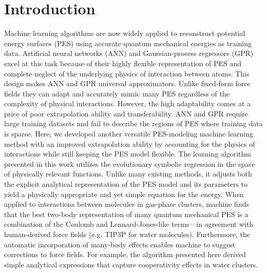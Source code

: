\documentclass[aps,prl,reprint,amsmath,amssymb,nature]{revtex4-1}
\begin{document}
\maketitle



\section{Introduction}

Machine learning algorithms are now widely applied to reconstruct potential energy surfaces (PES) using accurate quantum mechanical energies as training data. Artificial neural networks (ANN) and Gaussian-process regressors (GPR) excel at this task because of their highly flexible representation of PES and complete neglect of the underlying physics of interaction between atoms. This design makes ANN and GPR universal approximators. Unlike fixed-form force fields they can adapt and accurately mimic many PES regardless of the complexity of physical interactions. However, the high adaptability comes at a price of poor extrapolation ability and transferability. ANN and GPR require large training datasets and fail to describe the regions of PES where training data is sparse. Here, we developed another versatile PES-modeling machine learning method with an improved extrapolation ability by accounting for the physics of interactions while still keeping the PES model flexible. The learning algorithm presented in this work utilizes the evolutionary symbolic regression in the space of physically relevant functions. Unlike many existing methods, it adjusts both the explicit analytical representation of the PES model and its parameters to yield a physically appropriate and yet simple equation for the energy. When applied to interactions between molecules in gas-phase clusters, machine finds that the best two-body representation of many quantum mechanical PES is a combination of the Coulomb and Lennard-Jones-like terms---in agreement with human-derived force fields (e.g. TIP3P for water molecules). Furthermore, the automatic incorporation of many-body effects enables machine to suggest corrections to force fields. For example, the algorithm presented here derived simple analytical expressions that capture cooperativity effects in water clusters.
\end{document}
